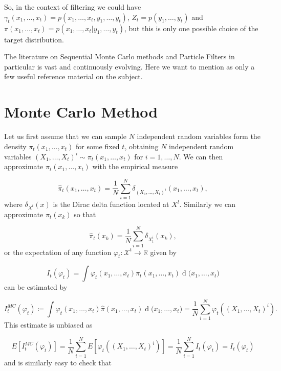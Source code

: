 \documentclass[11pt,a4paper]{article}
\renewcommand{\d}[1]{\ensuremath{\operatorname{d}\!{#1}}}
\begin{document}
So, in the context of filtering we could have $\gamma_t(x_1, \dots, x_t) = p(x_1, \dots, x_t, y_1, \dots, y_t)$, $Z_t = p(y_1, \dots, y_t)$ and $\pi(x_1, \dots, x_t) = p(x_1, \dots, x_t | y_1, \dots, y_t)$, but this is only one possible choice of the target distribution.

The literature on Sequential Monte Carlo methods and Particle Filters in particular is vast and continuously evolving. Here we want to mention \cite{} as only a few useful reference material on the subject.

\section{Monte Carlo Method}

Let us first assume that we can sample $N$ independent random variables form the density $\pi_t(x_1, \dots, x_t)$ for some fixed $t$, obtaining $N$ independent random variables $(X_1, \dots, X_t)^i \sim \pi_t(x_1, \dots, x_t)$ for $i = 1, \dots, N$. We can then approximate $\pi_t(x_1, \dots, x_t)$ with the empirical measure

\begin{equation*}
    \hat{\pi}_t(x_1, \dots, x_t) = \frac{1}{N} \sum_{i=1}^N \delta_{(X_1, \dots, X_t)^i}(x_1, \dots, x_t),
\end{equation*}
where $\delta_{X^l}(x)$ is the Dirac delta function located at $X^l$. Similarly we can approximate $\pi_t(x_k)$ so that

\begin{equation*}
    \hat{\pi}_t(x_k) = \frac{1}{N} \sum_{i=1}^N \delta_{X_t^i}(x_k),
\end{equation*}
or the expectation of any function $\varphi_t : \mathcal{X}^t \rightarrow \mathbb{R}$ given by

\begin{equation*}
    I_t(\varphi_t) = \int \varphi_t (x_1, \dots, x_t) \pi_t (x_1, \dots, x_t) \d (x_1, \dots, x_t)
\end{equation*}
can be estimated by

\begin{equation*}
    I^{MC}_t(\varphi_t) \coloneqq \int \varphi_t(x_1, \dots, x_t) \hat{\pi} (x_1, \dots, x_t) \d (x_1, \dots, x_t) = \frac{1}{N} \sum_{i=1}^N \varphi_t((X_1, \dots, X_t)^i).
\end{equation*}
This estimate is unbiased as

\begin{equation*}
    E[I^{MC}_t(\varphi_t)] = \frac{1}{N}\sum_{i=1}^N E[\varphi_t((X_1, \dots, X_t)^i)] = \frac{1}{N} \sum_{i=1}^N I_t(\varphi_t) = I_t(\varphi_t)
\end{equation*}
and is similarly easy to check that
\end{document}
